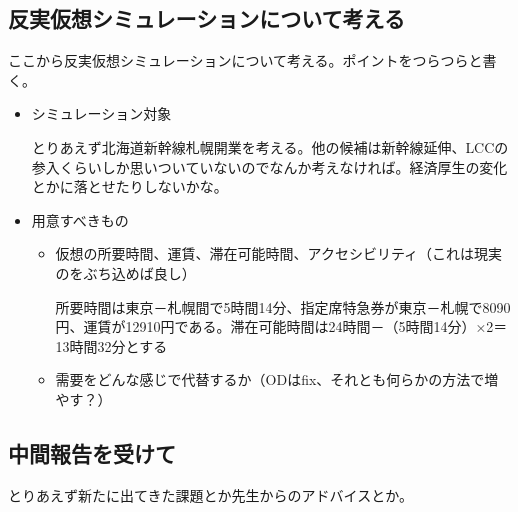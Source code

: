 \documentclass{jsarticle}
\begin{document}
\subsection{反実仮想シミュレーションについて考える}

ここから反実仮想シミュレーションについて考える。ポイントをつらつらと書く。

\begin{itemize} %
\item シミュレーション対象

とりあえず北海道新幹線札幌開業を考える。他の候補は新幹線延伸、LCCの参入くらいしか思いついていないのでなんか考えなければ。経済厚生の変化とかに落とせたりしないかな。

\item 用意すべきもの
\begin{itemize}
\item 仮想の所要時間、運賃、滞在可能時間、アクセシビリティ（これは現実のをぶち込めば良し）

所要時間は東京－札幌間で5時間14分、指定席特急券が東京－札幌で8090円、運賃が12910円である。滞在可能時間は24時間－（5時間14分）×2＝13時間32分とする

\item 需要をどんな感じで代替するか（ODはfix、それとも何らかの方法で増やす？）
\end{itemize}
\end{itemize}

\subsection{中間報告を受けて}

とりあえず新たに出てきた課題とか先生からのアドバイスとか。
\end{document}
